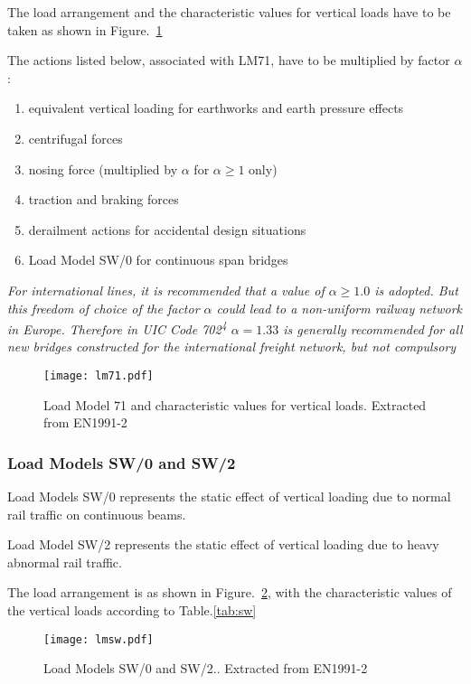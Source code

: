 The load arrangement and the characteristic values for vertical loads have to be taken as shown in Figure.~\ref{lm71}

The actions listed below, associated with LM71, have to be multiplied by factor $ \alpha $:

\begin{enumerate}[-]
	\item equivalent vertical loading for earthworks and earth pressure effects
	\item centrifugal forces
	\item nosing force (multiplied by $ \alpha $ for $ \alpha\geq 1 $ only)
	\item traction and braking forces
	\item derailment actions for accidental design situations
	\item Load Model SW/0 for continuous span bridges
\end{enumerate}

\textit{For international lines, it is recommended that a value of $ \alpha \geq 1.0 $ is adopted. But this freedom of choice of the factor $ \alpha $ could lead to a non-uniform railway network in Europe. Therefore in UIC Code 702\textsuperscript{4} $ \alpha=1.33 $ is generally recommended for all new bridges constructed for the international freight network, but not compulsory}

\begin{figure}[h]
	\centering
	\texttt{[image: lm71.pdf]}
	\caption{Load Model 71 and characteristic values for vertical loads. Extracted from EN1991-2\cite{EC12}}
	\label{lm71}
\end{figure}

\subsubsection{Load Models SW/0 and SW/2}
Load Models SW/0 represents the static effect of vertical loading due to normal rail traffic on continuous beams.

Load Model SW/2 represents the static effect of vertical loading due to heavy abnormal rail traffic. 

The load arrangement is as shown in Figure.~\ref{lmsw}, with the characteristic values of the vertical loads according to Table.\ref{tab:sw}

\begin{figure}[h]
	\centering
	\texttt{[image: lmsw.pdf]}
	\caption{Load Models SW/0 and SW/2.. Extracted from EN1991-2\cite{EC12}}
	\label{lmsw}
\end{figure}

